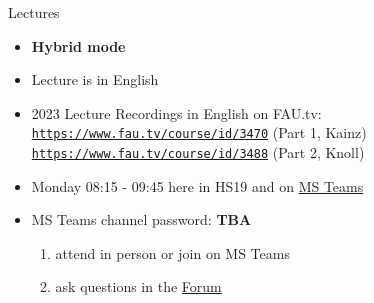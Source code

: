 \begin{frame}
\begin{columns}[c, onlytextwidth]
\begin{column}{0.3\textwidth}
		\end{column}
	\end{columns}
\end{frame}

\begin{frame}[c]{Lectures}
	\begin{itemize}
		\setlength\itemsep{0.4cm}
		\item \textbf{Hybrid mode}
		\item Lecture is in English
		\item 2023 Lecture Recordings in English on FAU.tv:\\
		\texttt{\url{https://www.fau.tv/course/id/3470}} (Part 1, Kainz)\\
		\texttt{\url{https://www.fau.tv/course/id/3488}} (Part 2, Knoll)
		\item Monday 08:15 - 09:45 here in HS19 and on \href{https://teams.microsoft.com/l/team/19\%3adRCxup9jUsjM31xr9T4jdAFDB-ImEk_lU5Fy05ijYx81\%40thread.tacv2/conversations?groupId=6b2df36b-cec0-46b3-83d2-b4e6d1c6ac30\&tenantId=b2efcef3-8496-40b8-9de8-f135982f3461}{MS Teams}
		\item MS Teams channel password: \textbf{TBA}
		\begin{enumerate}
			\item attend in person or join on MS Teams
			\item ask questions in the \href{https://www.studon.fau.de/studon/goto.php?target=frm_4685856}{Forum}
		\end{enumerate}
	\end{itemize}
\end{frame}

